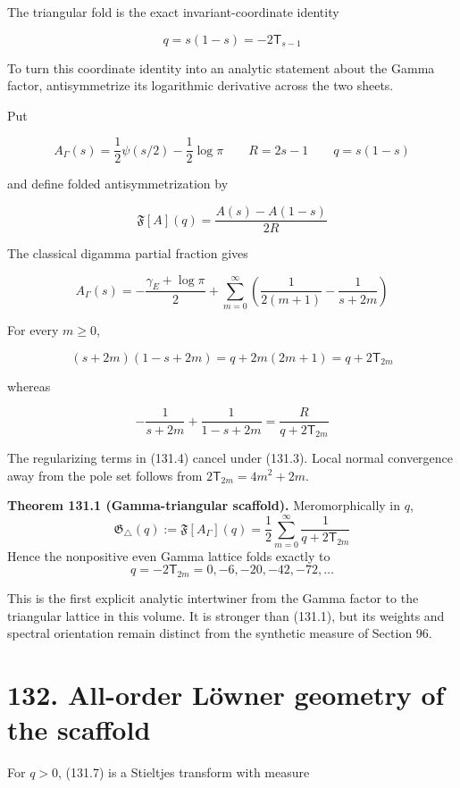 \documentclass[
  11pt,
]{book}
\renewenvironment{quote}
  {\begin{tcolorbox}[
      enhanced,
      breakable,
      colback=tncream,
      colframe=tnrust,
      boxrule=0.8pt,
      arc=1.5pt,
      left=7pt,
      right=7pt,
      top=6pt,
      bottom=6pt]}
  {\end{tcolorbox}}
\begin{document}
The triangular fold is the exact invariant-coordinate identity

\[
q=s(1-s)=-2\mathsf T_{s-1}
\tag{131.1}
\]

To turn this coordinate identity into an analytic statement about the
Gamma factor, antisymmetrize its logarithmic derivative across the two
sheets.

Put

\[
A_\Gamma(s)
=\frac12\psi(s/2)-\frac12\log\pi
\qquad
R=2s-1
\qquad
q=s(1-s)
\tag{131.2}
\]

and define folded antisymmetrization by

\[
\mathfrak F[A](q)
=\frac{A(s)-A(1-s)}{2R}
\tag{131.3}
\]

The classical digamma partial fraction gives

\[
A_\Gamma(s)
=-\frac{\gamma_E+\log\pi}{2}
+\sum_{m=0}^{\infty}
\left(
\frac1{2(m+1)}-\frac1{s+2m}
\right)
\tag{131.4}
\]

For every \(m\ge0\),

\[
(s+2m)(1-s+2m)
=q+2m(2m+1)
=q+2\mathsf T_{2m}
\tag{131.5}
\]

whereas

\[
-\frac1{s+2m}+\frac1{1-s+2m}
=\frac{R}{q+2\mathsf T_{2m}}
\tag{131.6}
\]

The regularizing terms in (131.4) cancel under (131.3). Local normal
convergence away from the pole set follows from
\(2\mathsf T_{2m}=4m^2+2m\).

\begin{quote}
\textbf{Theorem 131.1 (Gamma-triangular scaffold).} Meromorphically in
\(q\), \[
\boxed{
\mathfrak G_\triangle(q)
:=\mathfrak F[A_\Gamma](q)
=\frac12\sum_{m=0}^{\infty}
\frac1{q+2\mathsf T_{2m}}
}
\tag{131.7}
\] Hence the nonpositive even Gamma lattice folds exactly to \[
q=-2\mathsf T_{2m}=0,-6,-20,-42,-72,\ldots
\tag{131.8}
\]
\end{quote}

This is the first explicit analytic intertwiner from the Gamma factor to
the triangular lattice in this volume. It is stronger than (131.1), but
its weights and spectral orientation remain distinct from the synthetic
measure of Section 96.

\section{132. All-order Löwner geometry of the
scaffold}\label{all-order-luxf6wner-geometry-of-the-scaffold}

For \(q>0\), (131.7) is a Stieltjes transform with measure
\end{document}
